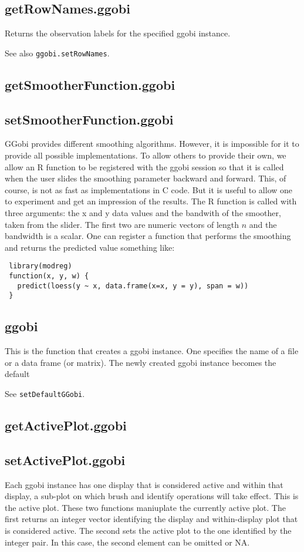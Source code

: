 \documentclass{article}
\def\SFunction#1{{\texttt{\red #1}}}
\begin{document}
\subsection{getRowNames.ggobi}
Returns the observation labels for the specified ggobi instance.

See also \SFunction{ggobi.setRowNames}.

\subsection{getSmootherFunction.ggobi}
\subsection{setSmootherFunction.ggobi}
GGobi provides different smoothing algorithms.  However, it is
impossible for it to provide all possible implementations.  To allow
others to provide their own, we allow an R function to be registered
with the ggobi session so that it is called when the user slides the
smoothing parameter backward and forward.  This, of course, is not as
fast as implementations in C code.  But it is useful to allow one to
experiment and get an impression of the results.
The R function is called with three arguments:
the x and y data values and the bandwith of the smoother,
taken from the slider. The first two are numeric vectors of length $n$
and the bandwidth is a scalar.
One can register a function that performs the 
smoothing and returns the predicted value something like:
\begin{verbatim}
 library(modreg)
 function(x, y, w) {
   predict(loess(y ~ x, data.frame(x=x, y = y), span = w))
 }
\end{verbatim}




\subsection{ggobi}
This is the function that creates a ggobi instance.
One specifies the name of a file or a data frame (or matrix).
The newly created ggobi instance becomes the default

See \SFunction{setDefaultGGobi}.


\subsection{getActivePlot.ggobi}
\subsection{setActivePlot.ggobi}
Each ggobi instance has one display that is considered active and
within that display, a sub-plot on which brush and identify operations
will take effect.  This is the active plot.  These two functions
maniuplate the currently active plot.  The first returns an integer
vector identifying the display and within-display plot that is
considered active.  The second sets the active plot to the one
identified by the integer pair.  In this case, the second element can
be omitted or NA.
\end{document}

